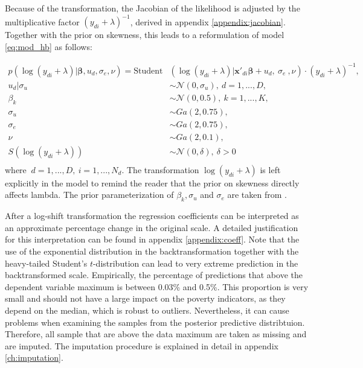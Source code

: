 Because of the transformation, the Jacobian of the likelihood is adjusted by the multiplicative factor $(y_{di} + \lambda)^{-1}$, derived in appendix \ref{appendix:jacobian}. Together with the prior on skewness, this leads to a reformulation of model \ref{eq:mod_hb} as follows:

\begin{equation}
    \begin{split}
        p(\log(y_{di} + \lambda) |\boldsymbol \beta, u_d, \sigma_e, \nu)   =        \text{Student}&(\log(y_{di} + \lambda)| \boldsymbol{x'}_{di} \boldsymbol \beta + u_d,\ \sigma_e\ , \nu)\cdot (y_{di} + \lambda)^{-1}, \\
        u_d | \sigma_u & \sim \mathcal N(0, \sigma_u),\ d = 1, ..., D, \\
        \beta_k & \sim \mathcal N(0, 0.5),\ k = 1, ..., K,\\
        \sigma_u & \sim Ga(2, 0.75), \\
        \sigma_e & \sim Ga(2, 0.75), \\
        \nu & \sim Ga(2, 0.1), \\
        S(\log(y_{di} + \lambda)) & \sim \mathcal N(0, \delta), ~ \delta > 0\\
    \end{split}
    \label{eq:trafo_hb}
\end{equation}
where $\ d = 1, ..., D,\ i = 1, ..., N_d$. The transformation $\log(y_{di} + \lambda)$ is left explicitly in the model to remind the reader that the prior on skewness directly affects lambda.
The prior parameterization of $\beta_k, \sigma_u$ and $\sigma_e$ are taken from \cite{morelli_hierarchical_2021}.

After a log-shift transformation the regression coefficients can be interpreted as an approximate percentage change in the original scale.
A detailed justification for this interpretation can be found in appendix \ref{appendix:coeff}.
Note that the use of the exponential distribution in the backtransformation together with the heavy-tailed Student's $t$-distribution can lead to very extreme prediction in the backtransformed scale.
Empirically, the percentage of predictions that above the dependent variable maximum is between 0.03\% and 0.5\%.
This proportion is very small and should not have a large impact on the poverty indicators, as they depend on the median, which is robust to outliers.
Nevertheless, it can cause problems when examining the samples from the posterior predictive distribtuion.
Therefore, all sample that are above the data maximum are taken as missing and are imputed.
The imputation procedure is explained in detail in appendix \ref{ch:imputation}.



